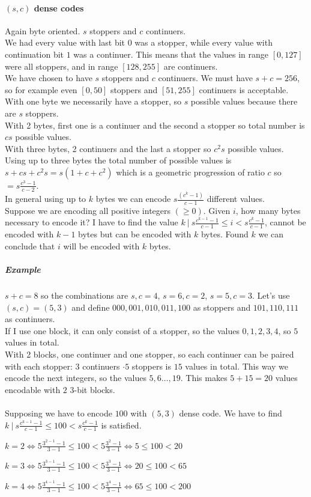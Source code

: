 \documentclass[10pt]{report}
\begin{document}
\paragraph{$(s, c)$ dense codes} Again byte oriented. $s$ stoppers and $c$ continuers.\\
We had every value with last bit $0$ was a stopper, while every value with continuation bit $1$ was a continuer. This means that the values in range $[0, 127]$ were all stoppers, and in range $[128, 255]$ are continuers.\\
We have chosen to have $s$ stoppers and $c$ continuers. We must have $s + c = 256$, so for example even $[0,50]$ stoppers and $[51, 255]$ continuers is acceptable. With one byte we necessarily have a stopper, so $s$ possible values because there are $s$ stoppers.\\
With 2 bytes, first one is a continuer and the second a stopper so total number is $cs$ possible values.\\
With three bytes, 2 continuers and the last a stopper so $c^2 s$ possible values.\\
Using up to three bytes the total number of possible values is $s + cs + c^2s = s(1 + c + c^2)$ which is a geometric progression of ratio $c$ so $=s\frac{c^3 - 1}{c-2}$.\\
In general using up to $k$ bytes we can encode $s\frac{(c^k - 1)}{c-1}$ different values.\\
Suppose we are encoding all positive integers $(\geq 0)$. Given $i$, how many bytes necessary to encode it? I have to find the value $k\:|\:s\frac{c^{k-1} - 1}{c-1}\leq i < s\frac{c^k-1}{c-1}$, cannot be encoded with $k-1$ bytes but can be encoded with $k$ bytes. Found $k$ we can conclude that $i$ will be encoded with $k$ bytes.
\subparagraph{Example} $s+c = 8$ so the combinations are $s, c = 4$, $s = 6, c = 2$, $s = 5, c = 3$. Let's use $(s,c) = (5,3)$ and define $000,001,010,011,100$ as stoppers and $101,110,111$ as continuers.\\
If I use one block, it can only consist of a stopper, so the values $0,1,2,3,4$, so $5$ values in total.\\
With 2 blocks, one continuer and one stopper, so each continuer can be paired with each stopper: $3$ continuers $\cdot 5$ stoppers is $15$ values in total. This way we encode the next integers, so the values $5,6\ldots,19$. This makes $5+15 = 20$ values encodable with $2$ $3$-bit blocks.\\\\
Supposing we have to encode $100$ with $(5,3)$ dense code. We have to find $k\:|\:s\frac{c^{k-1}-1}{c-1}\leq 100 < s\frac{c^k-1}{c-1}$ is satisfied.\begin{list}{}{}
	\item $k=2 \Leftrightarrow 5\frac{3^{2-1}-1}{3-1}\leq 100 < 5\frac{3^2-1}{3-1} \Leftrightarrow 5 \leq 100 < 20$
	\item $k=3 \Leftrightarrow 5\frac{3^{3-1}-1}{3-1}\leq 100 < 5\frac{3^3-1}{3-1} \Leftrightarrow 20 \leq 100 < 65$
	\item $k=4 \Leftrightarrow 5\frac{3^{4-1}-1}{3-1}\leq 100 < 5\frac{3^4-1}{3-1} \Leftrightarrow 65 \leq 100 < 200$
\end{list}
\end{document}
